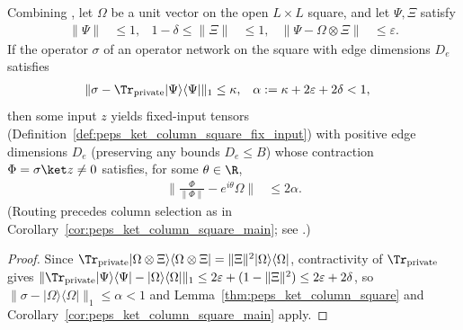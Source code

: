 \begin{lemma}
    \label{thm:peps_product_reference_column}
    \leanok
    Combining \cite[Section~8.1 and Lemma~8.1]{OpenAI2026PolynomialPEPS}, let $\Omega$ be a unit vector on the open $L\times L$ square, and let $\Psi,\Xi$ satisfy
    \begin{align}
        \lVert\Psi\rVert                  & \leq1,           &
        1-\delta\leq\lVert\Xi\rVert       & \leq1,           &
        \lVert\Psi-\Omega\otimes\Xi\rVert & \leq\varepsilon.
    \end{align}
    If the operator $\sigma$ of an operator network on the square with edge dimensions $D_e$ satisfies
    \begin{align}
        \lVert\sigma-\Tr_{\rm private}|\Psi\rangle\langle\Psi|\rVert_1
                                            & \leq\kappa, &
        \alpha:=\kappa+2\varepsilon+2\delta & <1,
    \end{align}
    then some input $z$ yields fixed-input tensors (Definition~\ref{def:peps_ket_column_square_fix_input}) with positive edge dimensions $D_e$ (preserving any bounds $D_e\le B$) whose contraction $\Phi=\sigma\ket z\ne0$ satisfies, for some $\theta\in\R$,
    \begin{align}
        \Big\lVert\frac{\Phi}{\lVert\Phi\rVert}
        -e^{i\theta}\Omega\Big\rVert & \leq2\alpha.
    \end{align}
    (Routing precedes column selection as in Corollary~\ref{cor:peps_ket_column_square_main}; see \cite{gap:polypeps_product_reference_column}.)
\end{lemma}

\begin{proof}\leanok
    Since $\Tr_{\rm private}|\Omega\otimes\Xi\rangle\langle\Omega\otimes\Xi|=\lVert\Xi\rVert^2|\Omega\rangle\langle\Omega|$, contractivity of $\Tr_{\rm private}$ gives $\lVert\Tr_{\rm private}|\Psi\rangle\langle\Psi|-|\Omega\rangle\langle\Omega|\rVert_1\le 2\varepsilon+(1-\lVert\Xi\rVert^2)\le 2\varepsilon+2\delta$, so $\lVert\sigma-|\Omega\rangle\langle\Omega|\rVert_1\le\alpha<1$ and Lemma~\ref{thm:peps_ket_column_square} and Corollary~\ref{cor:peps_ket_column_square_main} apply.
\end{proof}
